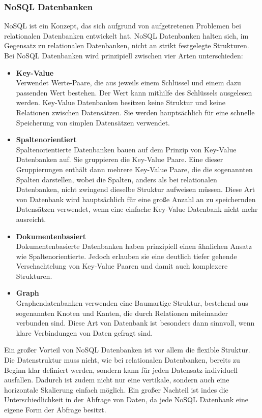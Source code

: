 \subsubsection{NoSQL Datenbanken}
NoSQL ist ein Konzept, das sich aufgrund von aufgetretenen Problemen bei relationalen Datenbanken entwickelt hat. NoSQL Datenbanken halten sich, im Gegensatz zu relationalen Datenbanken, nicht an strikt festgelegte Strukturen.\\
Bei NoSQL Datenbanken wird prinzipiell zwischen vier Arten unterschieden:
\begin{itemize}
\item \textbf{Key-Value}\\Verwendet Werte-Paare, die aus jeweils einem Schlüssel und einem dazu passenden Wert bestehen. Der Wert kann mithilfe des Schlüssels ausgelesen werden. Key-Value Datenbanken besitzen keine Struktur und keine Relationen zwischen Datensätzen. Sie werden hauptsächlich für eine schnelle Speicherung von simplen Datensätzen verwendet.
\item \textbf{Spaltenorientiert}\\Spaltenorientierte Datenbanken bauen auf dem Prinzip von Key-Value Datenbanken auf. Sie gruppieren die Key-Value Paare. Eine dieser Gruppierungen enthält dann mehrere Key-Value Paare, die die sogenannten Spalten darstellen, wobei die Spalten, anders als bei relationalen Datenbanken, nicht zwingend dieselbe Struktur aufweisen müssen. Diese Art von Datenbank wird hauptsächlich für eine große Anzahl an zu speichernden Datensätzen verwendet, wenn eine einfache Key-Value Datenbank nicht mehr ausreicht.
\item \textbf{Dokumentenbasiert}\\Dokumentenbasierte Datenbanken haben prinzipiell einen ähnlichen Ansatz wie Spaltenorientierte. Jedoch erlauben sie eine deutlich tiefer gehende Verschachtelung von Key-Value Paaren und damit auch komplexere Strukturen.
\item \textbf{Graph}\\Graphendatenbanken verwenden eine Baumartige Struktur, bestehend aus sogenannten Knoten und Kanten, die durch Relationen miteinander verbunden sind. Diese Art von Datenbank ist besonders dann sinnvoll, wenn klare Verbindungen von Daten gefragt sind.
\end{itemize}

Ein großer Vorteil von NoSQL Datenbanken ist vor allem die flexible Struktur. Die Datenstruktur muss nicht, wie bei relationalen Datenbanken, bereits zu Beginn klar definiert werden, sondern kann für jeden Datensatz individuell ausfallen. Dadurch ist zudem nicht nur eine vertikale, sondern auch eine horizontale Skalierung einfach möglich. Ein großer Nachteil ist indes die Unterschiedlichkeit in der Abfrage von Daten, da jede NoSQL Datenbank eine eigene Form der Abfrage besitzt. \cite{DATENRELNOSQL,DATENNOSQL}

